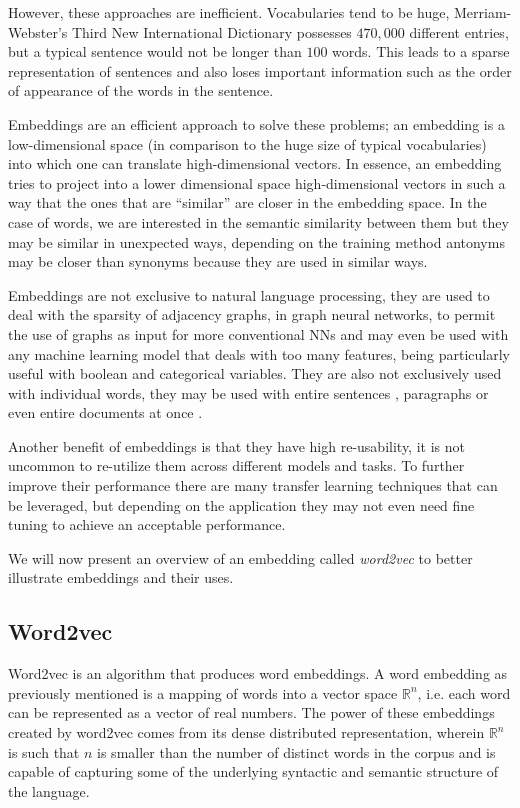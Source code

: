 However, these approaches are inefficient. Vocabularies tend to be huge, Merriam-Webster's Third New International Dictionary \citep{merriam} possesses $470,000$ different entries, but a typical sentence would not be longer than $100$ words. This leads to a sparse representation of sentences and also loses important information such as the order of appearance of the words in the sentence.

Embeddings are an efficient approach to solve these problems; an embedding is a low-dimensional space (in comparison to the huge size of typical vocabularies) into which one can translate high-dimensional vectors. In essence, an embedding tries to project into a lower dimensional space high-dimensional vectors in such a way that the ones that are ``similar'' are closer in the embedding space. In the case of words, we are interested in the semantic similarity between them but they may be similar in unexpected ways, depending on the training method antonyms may be closer than synonyms because they are used in similar ways.

Embeddings are not exclusive to natural language processing, they are used to deal with the sparsity of adjacency graphs, in graph neural networks, to permit the use of graphs as input for more conventional NNs \citep{grover2016node2vec} and may even be used with any machine learning model that deals with too many features, being particularly useful with boolean and categorical variables. They are also not exclusively used with individual words, they may be used with entire sentences \citep{sbert_paper}, paragraphs or even entire documents at once \citep{doc2vec}.


Another benefit of embeddings is that they have high re-usability, it is not uncommon to re-utilize them across different models and tasks. To further improve their performance there are many transfer learning techniques that can be leveraged, but depending on the application they may not even need fine tuning to achieve an acceptable performance.


We will now present an overview of an embedding called \textit{word2vec} to better illustrate embeddings and their uses.




\subsection{Word2vec}

Word2vec \citep{word2vec_original} is an algorithm that produces word embeddings. A word embedding as previously mentioned is a mapping of words into a vector space $\mathbb{R}^{n}$, i.e. each word can be represented as a vector of real numbers. 
The power of these embeddings created by word2vec comes from its dense distributed representation, wherein $\mathbb{R}^{n}$  is such that $n$ is smaller than the number of distinct words in the corpus and is capable of capturing some of the underlying syntactic and semantic structure of the language.

